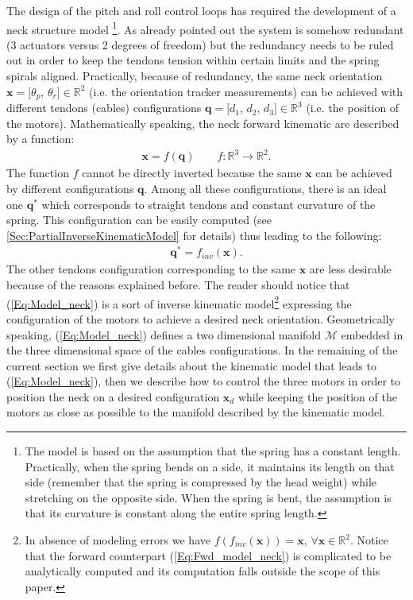\documentclass[conference]{IEEEtran}
\numberwithin{equation}{section}
\newcommand{\q}{\mathbf{q}}
\newcommand{\x}{\mathbf{x}}
\begin{document}
The design of the pitch and roll control loops has required the development of a neck structure model \footnote{The model is based on the assumption that the spring has a constant length. Practically, when the spring bends on a side, it maintains its length on that side (remember that the spring is compressed by the head weight) while stretching on the opposite side. When the spring is bent, the assumption is that its curvature is constant along the entire spring length.}.
As already pointed out the system is somehow redundant (3 actuators versus 2 degrees of freedom) but the redundancy needs to be ruled out in order to keep the tendons tension within certain limits and the spring spirals aligned. Practically, because of redundancy, the same neck orientation $\x = [\theta_p$, $\theta_r] \in \mathbb R^2$ (i.e. the orientation tracker measurements) can be achieved with different tendons (cables) configurations $\q = [d_1$, $d_2$, $d_3] \in \mathbb R^3$ (i.e. the position of the motors). Mathematically speaking, the neck forward kinematic are described by a function:
\begin{eqnarray} \label{Eq:Fwd_model_neck}
\x = f (\q) \qquad f:\mathbb{R}^3 \rightarrow \mathbb{R}^2.
\end{eqnarray}
The function $f$ cannot be directly inverted because the same $\x$ can be achieved by different configurations $\q$. Among all these configurations, there is an ideal one $\q^*$ which corresponds to straight tendons and constant curvature of the spring. This configuration can be easily computed (see \ref{Sec:PartialInverseKinematicModel} for details) thus leading to the following:
\begin{eqnarray} \label{Eq:Model_neck}
\q^* = f_{inv} (\x).
\end{eqnarray}
The other tendons configuration corresponding to the same $\x$ are less desirable because of the reasons explained before. The reader should notice that (\ref{Eq:Model_neck}) is a sort of inverse kinematic model\footnote{In absence of modeling errors we have $f(f_{inv}(\x)) = \x$, $\forall \x \in \mathbb R^2$. Notice that the forward counterpart (\ref{Eq:Fwd_model_neck}) is  complicated to be analytically computed and its computation falls outside the scope of this paper.} expressing the configuration of the motors to achieve a desired neck orientation. Geometrically speaking, (\ref{Eq:Model_neck}) defines a two dimensional manifold $\mathcal M$ embedded in the three dimensional space of the cables configurations.
In the remaining of the current section we first give details about the kinematic model that leads to (\ref{Eq:Model_neck}), then we describe how to control the three motors in order to position the neck on a desired configuration $\x_d$ while keeping the position of the motors as close as possible to the manifold described by the kinematic model.
\end{document}
